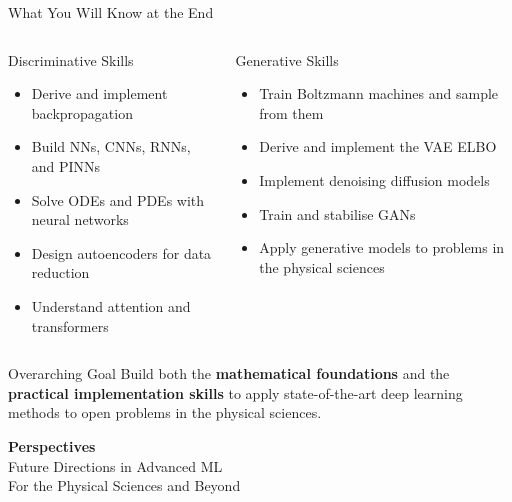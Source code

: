 \documentclass[aspectratio=169,11pt]{beamer}
\begin{document}
\begin{frame}{What You Will Know at the End}
  \begin{columns}[T]
      \begin{block}{Discriminative Skills}
        \begin{itemize}\itemsep2pt
          \item Derive and implement backpropagation
          \item Build NNs, CNNs, RNNs, and PINNs
          \item Solve ODEs and PDEs with neural networks
          \item Design autoencoders for data reduction
          \item Understand attention and transformers
        \end{itemize}
      \end{block}
      \begin{block}{Generative Skills}
        \begin{itemize}\itemsep2pt
          \item Train Boltzmann machines and sample from them
          \item Derive and implement the VAE ELBO
          \item Implement denoising diffusion models
          \item Train and stabilise GANs
          \item Apply generative models to problems in the physical sciences
        \end{itemize}
      \end{block}
  \end{columns}
  \vspace{5pt}
  \begin{alertblock}{Overarching Goal}
    Build both the \textbf{mathematical foundations} and the
    \textbf{practical implementation skills} to apply state-of-the-art
    deep learning methods to open problems in the physical sciences.
  \end{alertblock}
\end{frame}


\begin{frame}[plain]
  \begin{center}
    \vspace{1.4cm}
    {\Huge\bfseries\color{mlred} Perspectives}\\[0.5em]
    {\Large\color{mldark} Future Directions in Advanced ML}\\[0.3em]
    {\normalsize\color{gray} For the Physical Sciences and Beyond}
  \end{center}
\end{frame}
\end{document}
